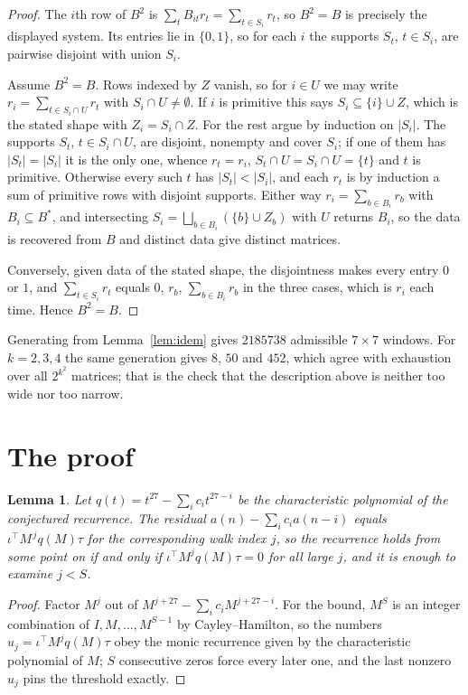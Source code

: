 \documentclass[11pt,a4paper]{article}
\theoremstyle{plain}
\newtheorem{lemma}[theorem]{Lemma}
\theoremstyle{definition}
\begin{document}
\begin{proof}
The $i$th row of $B^2$ is $\sum_t B_{it}r_t=\sum_{t\in S_i}r_t$, so $B^2=B$ is precisely the
displayed system. Its entries lie in $\{0,1\}$, so for each $i$ the supports $S_t$,
$t\in S_i$, are pairwise disjoint with union $S_i$.

Assume $B^2=B$. Rows indexed by $Z$ vanish, so for $i\in U$ we may write
$r_i=\sum_{t\in S_i\cap U}r_t$ with $S_i\cap U\neq\emptyset$. If $i$ is primitive this says
$S_i\subseteq\{i\}\cup Z$, which is the stated shape with $Z_i=S_i\cap Z$. For the rest argue
by induction on $|S_i|$. The supports $S_t$, $t\in S_i\cap U$, are disjoint, nonempty and
cover $S_i$; if one of them has $|S_t|=|S_i|$ it is the only one, whence $r_t=r_i$,
$S_t\cap U=S_i\cap U=\{t\}$ and $t$ is primitive. Otherwise every such $t$ has
$|S_t|<|S_i|$, and each $r_t$ is by induction a sum of primitive rows with disjoint supports.
Either way $r_i=\sum_{b\in B_i}r_b$ with $B_i\subseteq B^{\ast}$, and intersecting
$S_i=\bigsqcup_{b\in B_i}(\{b\}\cup Z_b)$ with $U$ returns $B_i$, so the data is recovered
from $B$ and distinct data give distinct matrices.

Conversely, given data of the stated shape, the disjointness makes every entry $0$ or $1$, and
$\sum_{t\in S_i}r_t$ equals $0$, $r_b$, $\sum_{b\in B_i}r_b$ in the three cases, which is
$r_i$ each time. Hence $B^2=B$.
\end{proof}

Generating from Lemma~\ref{lem:idem} gives $2185738$ admissible $7\times7$ windows. For
$k=2,3,4$ the same generation gives $8$, $50$ and $452$, which agree with exhaustion over all
$2^{k^2}$ matrices; that is the check that the description above is neither too wide nor too
narrow.

\section{The proof}

\begin{lemma}\label{lem:crit}
Let $q(t)=t^{27}-\sum_i c_it^{27-i}$ be the characteristic polynomial of the
conjectured recurrence. The residual $a(n)-\sum_ic_ia(n-i)$ equals
$\iota^{\!\top}M^{\,j}q(M)\tau$ for the corresponding walk index $j$, so the recurrence
holds from some point on if and only if $\iota^{\!\top}M^{j}q(M)\tau=0$ for all large $j$,
and it is enough to examine $j<S$.
\end{lemma}

\begin{proof}
Factor $M^{j}$ out of $M^{j+27}-\sum_ic_iM^{j+27-i}$. For the bound, $M^{S}$
is an integer combination of $I,M,\dots,M^{S-1}$ by Cayley--Hamilton, so the numbers
$u_j=\iota^{\!\top}M^{j}q(M)\tau$ obey the monic recurrence given by the characteristic
polynomial of $M$; $S$ consecutive zeros force every later one, and the last nonzero $u_j$
pins the threshold exactly.
\end{proof}
\end{document}

